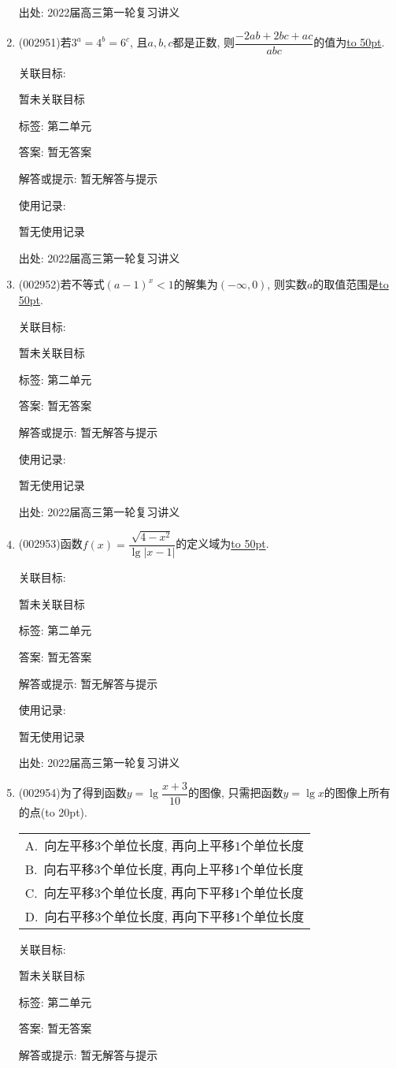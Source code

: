 \documentclass[10pt,a4paper]{article}
\newcommand{\blank}[1]{\underline{\hbox to #1pt{}}}
\newcommand{\bracket}[1]{(\hbox to #1pt{})}
\newcommand{\onech}[4]{\par\begin{tabular}{p{.9\textwidth}}
A.~#1\\
B.~#2\\
C.~#3\\
D.~#4
\end{tabular}}
\begin{document}
\begin{enumerate}[1.]
出处: 2022届高三第一轮复习讲义
\item { (002951)}若$3^a=4^b=6^c$, 且$a,b,c$都是正数, 则$\dfrac{-2ab+2bc+ac}{abc}$的值为\blank{50}.


关联目标:

暂未关联目标



标签: 第二单元

答案: 暂无答案

解答或提示: 暂无解答与提示

使用记录:

暂无使用记录


出处: 2022届高三第一轮复习讲义
\item { (002952)}若不等式$(a-1)^x<1$的解集为$(-\infty,0)$, 则实数$a$的取值范围是\blank{50}.


关联目标:

暂未关联目标



标签: 第二单元

答案: 暂无答案

解答或提示: 暂无解答与提示

使用记录:

暂无使用记录


出处: 2022届高三第一轮复习讲义
\item { (002953)}函数$f(x)=\dfrac{\sqrt{4-x^2}}{\lg |x-1|}$的定义域为\blank{50}.


关联目标:

暂未关联目标



标签: 第二单元

答案: 暂无答案

解答或提示: 暂无解答与提示

使用记录:

暂无使用记录


出处: 2022届高三第一轮复习讲义
\item { (002954)}为了得到函数$y=\lg\dfrac{x+3}{10}$的图像, 只需把函数$y=\lg x$的图像上所有的点\bracket{20}.
\onech{向左平移$3$个单位长度, 再向上平移$1$个单位长度}{向右平移$3$个单位长度, 再向上平移$1$个单位长度}{向左平移$3$个单位长度, 再向下平移$1$个单位长度}{向右平移$3$个单位长度, 再向下平移$1$个单位长度}


关联目标:

暂未关联目标



标签: 第二单元

答案: 暂无答案

解答或提示: 暂无解答与提示


\end{enumerate}
\end{document}
